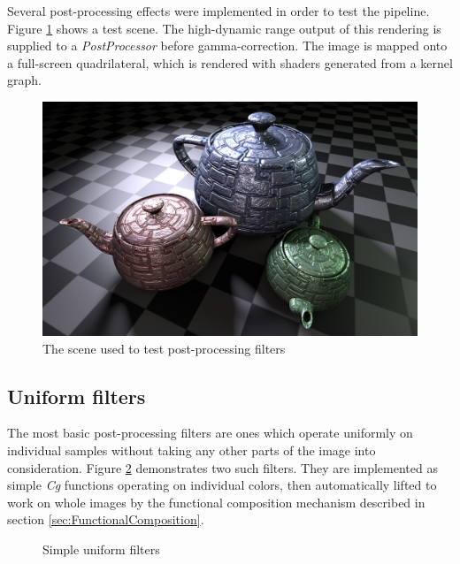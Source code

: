 Several post-processing effects were implemented in order to test the pipeline. Figure \ref{fig:postProcOff} shows a test scene. The high-dynamic range output of this rendering is supplied to a \emph{PostProcessor} before gamma-correction. The image is mapped onto a full-screen quadrilateral, which is rendered with shaders generated from a kernel graph.

\begin{figure}[h!]
  \centering
  \includegraphics[width=0.45\linewidth]{./Figures/postProc/off.jpg}
  \caption[Post-processing test scene]{The scene used to test post-processing filters}
  \label{fig:postProcOff}
\end{figure}

\subsection{Uniform filters}

The most basic post-processing filters are ones which operate uniformly on individual samples without taking any other parts of the image into consideration. Figure \ref{fig:postProcSimple} demonstrates two such filters. They are implemented as simple \emph{Cg} functions operating on individual colors, then automatically lifted to work on whole images by the functional composition mechanism described in section \ref{sec:FunctionalComposition}.

\begin{figure}[h!]
  \centering
  \caption{Simple uniform filters}
  \label{fig:postProcSimple}
\end{figure}


